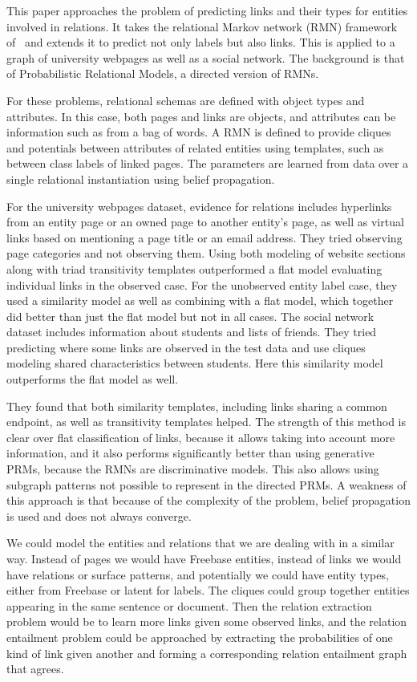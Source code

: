 \documentclass{article}
\begin{document}
This paper approaches the problem of predicting links and their types for entities involved in relations. It takes the relational Markov network (RMN) framework of~\cite{Taskar:2002:DPM:2073876.2073934} and extends it to predict not only labels but also links. This is applied to a graph of university webpages as well as a social network. The background is that of Probabilistic Relational Models, a directed version of RMNs.

For these problems, relational schemas are defined with object types and attributes. In this case, both pages and links are objects, and attributes can be information such as from a bag of words. A RMN is defined to provide cliques and potentials between attributes of related entities using templates, such as between class labels of linked pages. The parameters are learned from data over a single relational instantiation using belief propagation.

For the university webpages dataset, evidence for relations includes hyperlinks from an entity page or an owned page to another entity's page, as well as virtual links based on mentioning a page title or an email address. They tried observing page categories and not observing them. Using both modeling of website sections along with triad transitivity templates outperformed a flat model evaluating individual links in the observed case. For the unobserved entity label case, they used a similarity model as well as combining with a flat model, which together did better than just the flat model but not in all cases. The social network dataset includes information about students and lists of friends. They tried predicting where some links are observed in the test data and use cliques modeling shared characteristics between students. Here this similarity model outperforms the flat model as well.

They found that both similarity templates, including links sharing a common endpoint, as well as transitivity templates helped. The strength of this method is clear over flat classification of links, because it allows taking into account more information, and it also performs significantly better than using generative PRMs, because the RMNs are discriminative models. This also allows using subgraph patterns not possible to represent in the directed PRMs. A weakness of this approach is that because of the complexity of the problem, belief propagation is used and does not always converge.

We could model the entities and relations that we are dealing with in a similar way. Instead of pages we would have Freebase entities, instead of links we would have relations or surface patterns, and potentially we could have entity types, either from Freebase or latent for labels. The cliques could group together entities appearing in the same sentence or document. Then the relation extraction problem would be to learn more links given some observed links, and the relation entailment problem could be approached by extracting the probabilities of one kind of link given another and forming a corresponding relation entailment graph that agrees.



\end{document}
